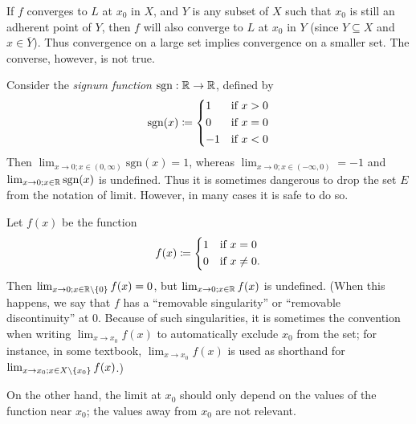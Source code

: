 \begin{note}
  If \(f\) converges to \(L\) at \(x_0\) in \(X\), and \(Y\) is any subset of \(X\) such that \(x_0\) is still an adherent point of \(Y\), then \(f\) will also converge to \(L\) at \(x_0\) in \(Y\)
  (since \(Y \subseteq X\) and \(x \in \overline{Y}\)).
  Thus convergence on a large set implies convergence on a smaller set.
  The converse, however, is not true.
\end{note}

\begin{eg}\label{9.3.16}
  Consider the \emph{signum function} \(\text{sgn} : \mathbb{R} \to \mathbb{R}\), defined by
  \[
    \text{sgn}(x) \coloneqq \begin{dcases}
      1  & \text{if } x > 0 \\
      0  & \text{if } x = 0 \\
      -1 & \text{if } x < 0
    \end{dcases}
  \]
  Then \(\lim_{x \to 0 ; x \in (0, \infty)} \text{sgn}(x) = 1\), whereas \(\lim_{x \to 0 ; x \in (-\infty, 0)} = -1\) and \(\lim_{x \to 0 ; x \in \mathbb{R}} \text{sgn}(x)\) is undefined.
  Thus it is sometimes dangerous to drop the set \(E\) from the notation of limit.
  However, in many cases it is safe to do so.
\end{eg}

\begin{eg}\label{9.3.17}
  Let \(f(x)\) be the function
  \[
    f(x) \coloneqq \begin{dcases}
      1 & \text{if } x = 0     \\
      0 & \text{if } x \neq 0.
    \end{dcases}
  \]
  Then \(\lim_{x \to 0 ; x \in \mathbb{R} \setminus \left\lbrace0\right\rbrace} f(x) = 0\), but \(\lim_{x \to 0 ; x \in \mathbb{R}} f(x)\) is undefined.
  (When this happens, we say that \(f\) has a ``removable singularity'' or ``removable discontinuity'' at \(0\).
  Because of such singularities, it is sometimes the convention when writing \(\lim_{x \to x_0} f(x)\) to automatically exclude \(x_0\) from the set;
  for instance, in some textbook, \(\lim_{x \to x_0} f(x)\) is used as shorthand for \(\lim_{x \to x_0 ; x \in X \setminus \left\lbrace x_0\right\rbrace} f(x)\).)
\end{eg}

\begin{note}
  On the other hand, the limit at \(x_0\) should only depend on the values of the function near \(x_0\);
  the values away from \(x_0\) are not relevant.
\end{note}

